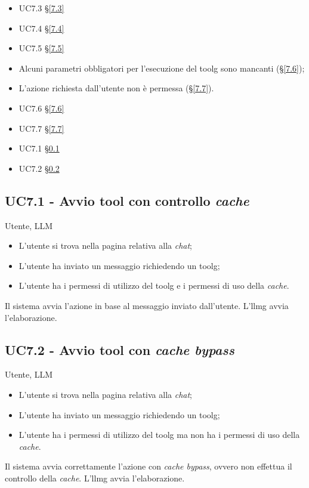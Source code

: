 {   \begin{itemize}
        \item UC7.3 §\ref{7.3}
        \item UC7.4 §\ref{7.4}
        \item UC7.5 §\ref{7.5}
    \end{itemize} 
}
{
    \begin{itemize}
        \item Alcuni parametri obbligatori per l'esecuzione del \gls{toolg} sono mancanti (§\ref{7.6});
        \item L'azione richiesta dall'utente non è permessa (§\ref{7.7}).
    \end{itemize}
}
{
    \begin{itemize}
        \item UC7.6 §\ref{7.6}
        \item UC7.7 §\ref{7.7}
    \end{itemize}
}{
    \begin{itemize}
        \item UC7.1 §\ref{7.1}
        \item UC7.2 §\ref{7.2}
    \end{itemize}
}

\subsection{UC7.1 - Avvio tool con controllo \textit{cache}}
\label{7.1}
\makeUC{}
{Utente, LLM}
{
    \begin{itemize}
        \item L'utente si trova nella pagina relativa alla \textit{chat};
        \item L'utente ha inviato un messaggio richiedendo un \gls{toolg};
        \item L'utente ha i permessi di utilizzo del \gls{toolg} e i permessi di uso della \textit{cache}.
    \end{itemize}
}
{Il sistema avvia l'azione in base al messaggio inviato dall'utente.}
{L'\gls{llmg} avvia l'elaborazione.}{}{}{}{}

\subsection{UC7.2 - Avvio tool con \textit{cache bypass}}
\label{7.2}
\makeUC{}
{Utente, LLM}
{
    \begin{itemize}
        \item L'utente si trova nella pagina relativa alla \textit{chat};
        \item L'utente ha inviato un messaggio richiedendo un \gls{toolg};
        \item L'utente ha i permessi di utilizzo del \gls{toolg} ma non ha i permessi di uso della \textit{cache}.
    \end{itemize}
}
{Il sistema avvia correttamente l'azione con \textit{cache bypass}, ovvero non effettua il 
controllo della \textit{cache}.}
{L'\gls{llmg} avvia l'elaborazione.}{}{}{}{}

